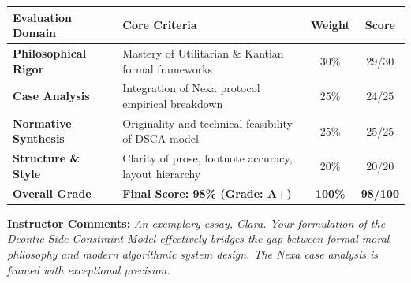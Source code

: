 \documentclass[11pt,a4paper]{article}
\begin{document}
\begin{tcolorbox}[title=\faGraduationCap~\ Instructor Assessment \& Rubric Matrix, colframe=navyblue, colback=parchment]
\small
\begin{tabularx}{\textwidth}{@{} l l C C @{}}
\toprule
\textbf{Evaluation Domain} & \textbf{Core Criteria} & \textbf{Weight} & \textbf{Score} \\
\midrule
\textbf{Philosophical Rigor} & Mastery of Utilitarian \& Kantian formal frameworks & 30\% & 29/30 \\
\textbf{Case Analysis} & Integration of Nexa protocol empirical breakdown & 25\% & 24/25 \\
\textbf{Normative Synthesis} & Originality and technical feasibility of DSCA model & 25\% & 25/25 \\
\textbf{Structure \& Style} & Clarity of prose, footnote accuracy, layout hierarchy & 20\% & 20/20 \\
\midrule
{}
\textbf{Overall Grade} & \textbf{Final Score: 98\% (Grade: A+)} & \textbf{100\%} & \textbf{98/100} \\
\bottomrule
\end{tabularx}

\vspace{0.15em}
\textbf{Instructor Comments:} \textit{An exemplary essay, Clara. Your formulation of the Deontic Side-Constraint Model effectively bridges the gap between formal moral philosophy and modern algorithmic system design. The Nexa case analysis is framed with exceptional precision.}
\end{tcolorbox}
\end{document}
